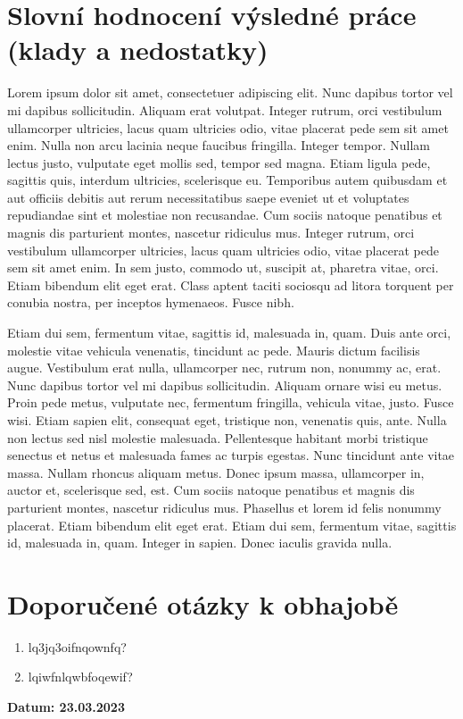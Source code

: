 \documentclass[a4paper,10pt]{article}
\begin{document}
\section*{\sffamily \centering Slovní hodnocení výsledné práce (klady a
nedostatky)}
Lorem ipsum dolor sit amet, consectetuer adipiscing elit. Nunc dapibus tortor vel mi dapibus sollicitudin. Aliquam erat volutpat. Integer rutrum, orci vestibulum ullamcorper ultricies, lacus quam ultricies odio, vitae placerat pede sem sit amet enim. Nulla non arcu lacinia neque faucibus fringilla. Integer tempor. Nullam lectus justo, vulputate eget mollis sed, tempor sed magna. Etiam ligula pede, sagittis quis, interdum ultricies, scelerisque eu. Temporibus autem quibusdam et aut officiis debitis aut rerum necessitatibus saepe eveniet ut et voluptates repudiandae sint et molestiae non recusandae. Cum sociis natoque penatibus et magnis dis parturient montes, nascetur ridiculus mus. Integer rutrum, orci vestibulum ullamcorper ultricies, lacus quam ultricies odio, vitae placerat pede sem sit amet enim. In sem justo, commodo ut, suscipit at, pharetra vitae, orci. Etiam bibendum elit eget erat. Class aptent taciti sociosqu ad litora torquent per conubia nostra, per inceptos hymenaeos. Fusce nibh.

Etiam dui sem, fermentum vitae, sagittis id, malesuada in, quam. Duis ante orci, molestie vitae vehicula venenatis, tincidunt ac pede. Mauris dictum facilisis augue. Vestibulum erat nulla, ullamcorper nec, rutrum non, nonummy ac, erat. Nunc dapibus tortor vel mi dapibus sollicitudin. Aliquam ornare wisi eu metus. Proin pede metus, vulputate nec, fermentum fringilla, vehicula vitae, justo. Fusce wisi. Etiam sapien elit, consequat eget, tristique non, venenatis quis, ante. Nulla non lectus sed nisl molestie malesuada. Pellentesque habitant morbi tristique senectus et netus et malesuada fames ac turpis egestas. Nunc tincidunt ante vitae massa. Nullam rhoncus aliquam metus. Donec ipsum massa, ullamcorper in, auctor et, scelerisque sed, est. Cum sociis natoque penatibus et magnis dis parturient montes, nascetur ridiculus mus. Phasellus et lorem id felis nonummy placerat. Etiam bibendum elit eget erat. Etiam dui sem, fermentum vitae, sagittis id, malesuada in, quam. Integer in sapien. Donec iaculis gravida nulla.

\section*{\sffamily \centering Doporučené otázky k obhajobě}

\begin{enumerate}
  \item lq3jq3oifnqownfq?
\item lqiwfnlqwbfoqewif?
\end{enumerate}

\vfill

\textbf{Datum:
23.03.2023
}
\end{document}
